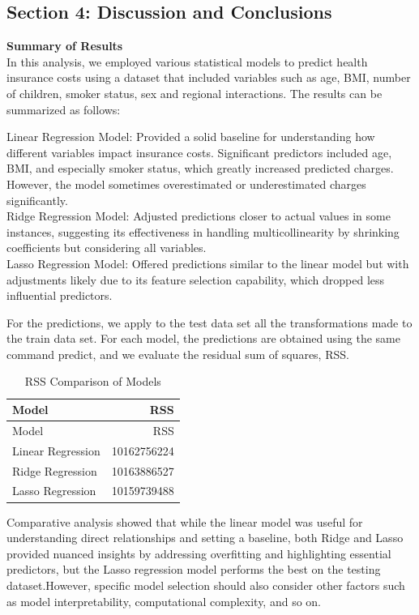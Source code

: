 \documentclass[
  12pt,
]{article}
\begin{document}
\newpage

\subsection{Section 4: Discussion and
Conclusions}\label{section-4-discussion-and-conclusions}

\textbf{Summary of Results}\\
In this analysis, we employed various statistical models to predict
health insurance costs using a dataset that included variables such as
age, BMI, number of children, smoker status, sex and regional
interactions. The results can be summarized as follows:

Linear Regression Model: Provided a solid baseline for understanding how
different variables impact insurance costs. Significant predictors
included age, BMI, and especially smoker status, which greatly increased
predicted charges. However, the model sometimes overestimated or
underestimated charges significantly.\\
Ridge Regression Model: Adjusted predictions closer to actual values in
some instances, suggesting its effectiveness in handling
multicollinearity by shrinking coefficients but considering all
variables.\\
Lasso Regression Model: Offered predictions similar to the linear model
but with adjustments likely due to its feature selection capability,
which dropped less influential predictors.

For the predictions, we apply to the test data set all the
transformations made to the train data set. For each model, the
predictions are obtained using the same command predict, and we evaluate
the residual sum of squares, RSS.

\begin{longtable}[]{@{}lr@{}}
\caption{RSS Comparison of Models}\tabularnewline
\toprule\noalign{}
Model & RSS \\
\midrule\noalign{}
\endfirsthead
\toprule\noalign{}
Model & RSS \\
\midrule\noalign{}
\endhead
\bottomrule\noalign{}
\endlastfoot
Linear Regression & 10162756224 \\
Ridge Regression & 10163886527 \\
Lasso Regression & 10159739488 \\
\end{longtable}

Comparative analysis showed that while the linear model was useful for
understanding direct relationships and setting a baseline, both Ridge
and Lasso provided nuanced insights by addressing overfitting and
highlighting essential predictors, but the Lasso regression model
performs the best on the testing dataset.However, specific model
selection should also consider other factors such as model
interpretability, computational complexity, and so on.
\end{document}

